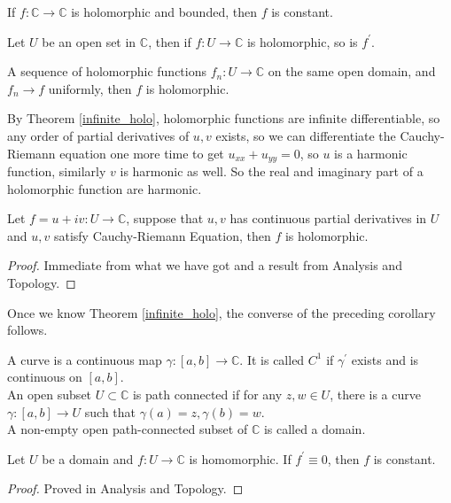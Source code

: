\begin{theorem}\label{holo_bdd_const}
    If $f:\mathbb C\to \mathbb C$ is holomorphic and bounded, then $f$ is constant.
\end{theorem}
\begin{theorem}\label{infinite_holo}
    Let $U$ be an open set in $\mathbb C$, then if $f:U\to\mathbb C$ is holomorphic, so is $f^\prime$.
\end{theorem}
\begin{theorem}\label{uniform_holo}
    A sequence of holomorphic functions $f_n:U\to\mathbb C$ on the same open domain, and $f_n\to f$ uniformly, then $f$ is holomorphic.
\end{theorem}
By Theorem \ref{infinite_holo}, holomorphic functions are infinite differentiable, so any order of partial derivatives of $u,v$ exists, so we can differentiate the Cauchy-Riemann equation one more time to get $u_{xx}+u_{yy}=0$, so $u$ is a harmonic function, similarly $v$ is harmonic as well.
So the real and imaginary part of a holomorphic function are harmonic.
\begin{corollary}
    Let $f=u+iv:U\to\mathbb C$, suppose that $u,v$ has continuous partial derivatives in $U$ and $u,v$ satisfy Cauchy-Riemann Equation, then $f$ is holomorphic.
\end{corollary}
\begin{proof}
    Immediate from what we have got and a result from Analysis and Topology.
\end{proof}
\begin{remark}
    Once we know Theorem \ref{infinite_holo}, the converse of the preceding corollary follows.
\end{remark}
\begin{definition}
    A curve is a continuous map $\gamma:[a,b]\to\mathbb C$.
    It is called $C^1$ if $\gamma^\prime$ exists and is continuous on $[a,b]$.\\
    An open subset $U\subset\mathbb C$ is path connected if for any $z,w\in U$, there is a curve $\gamma:[a,b]\to U$ such that $\gamma(a)=z,\gamma(b)=w$.\\
    A non-empty open path-connected subset of $\mathbb C$ is called a domain.
\end{definition}
\begin{corollary}
    Let $U$ be a domain and $f:U\to\mathbb C$ is homomorphic. If $f^\prime\equiv 0$, then $f$ is constant.
\end{corollary}
\begin{proof}
    Proved in Analysis and Topology.
\end{proof}
